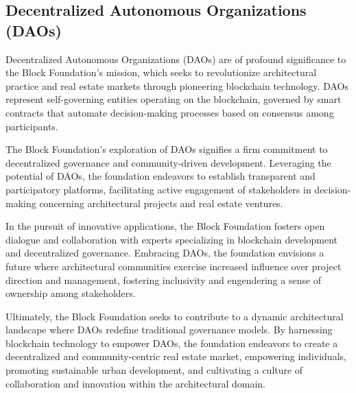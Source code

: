 \subsection{Decentralized Autonomous Organizations (DAOs)}

Decentralized Autonomous Organizations (DAOs) are of profound significance to the Block Foundation's mission, which seeks to revolutionize architectural practice and real estate markets through pioneering blockchain technology. DAOs represent self-governing entities operating on the blockchain, governed by smart contracts that automate decision-making processes based on consensus among participants.

The Block Foundation's exploration of DAOs signifies a firm commitment to decentralized governance and community-driven development. Leveraging the potential of DAOs, the foundation endeavors to establish transparent and participatory platforms, facilitating active engagement of stakeholders in decision-making concerning architectural projects and real estate ventures.

In the pursuit of innovative applications, the Block Foundation fosters open dialogue and collaboration with experts specializing in blockchain development and decentralized governance. Embracing DAOs, the foundation envisions a future where architectural communities exercise increased influence over project direction and management, fostering inclusivity and engendering a sense of ownership among stakeholders.

Ultimately, the Block Foundation seeks to contribute to a dynamic architectural landscape where DAOs redefine traditional governance models. By harnessing blockchain technology to empower DAOs, the foundation endeavors to create a decentralized and community-centric real estate market, empowering individuals, promoting sustainable urban development, and cultivating a culture of collaboration and innovation within the architectural domain.
